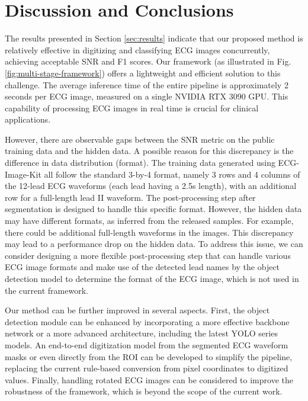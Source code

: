 \section{Discussion and Conclusions}
\label{sec:discu}


The results presented in Section \ref{sec:results} indicate that our proposed method is relatively effective in digitizing and classifying ECG images concurrently, achieving acceptable SNR and F1 scores. Our framework (as illustrated in Fig. \ref{fig:multi-stage-framework}) offers a lightweight and efficient solution to this challenge. The average inference time of the entire pipeline is approximately 2 seconds per ECG image, measured on a single NVIDIA RTX 3090 GPU. This capability of processing ECG images in real time is crucial for clinical applications.

However, there are observable gaps between the SNR metric on the public training data and the hidden data. A possible reason for this discrepancy is the difference in data distribution (format). The training data generated using ECG-Image-Kit \cite{Shivashankara_2024_ECG} all follow the standard 3-by-4 format, namely 3 rows and 4 columns of the 12-lead ECG waveforms (each lead having a 2.5s length), with an additional row for a full-length lead II waveform. The post-processing step after segmentation is designed to handle this specific format. However, the hidden data may have different formats, as inferred from the released samples. For example, there could be additional full-length waveforms in the images. This discrepancy may lead to a performance drop on the hidden data. To address this issue, we can consider designing a more flexible post-processing step that can handle various ECG image formats and make use of the detected lead names by the object detection model to determine the format of the ECG image, which is not used in the current framework.

Our method can be further improved in several aspects. First, the object detection module can be enhanced by incorporating a more effective backbone network or a more advanced architecture, including the latest YOLO series models. An end-to-end digitization model from the segmented ECG waveform masks or even directly from the ROI can be developed to simplify the pipeline, replacing the current rule-based conversion from pixel coordinates to digitized values. Finally, handling rotated ECG images can be considered to improve the robustness of the framework, which is beyond the scope of the current work.

